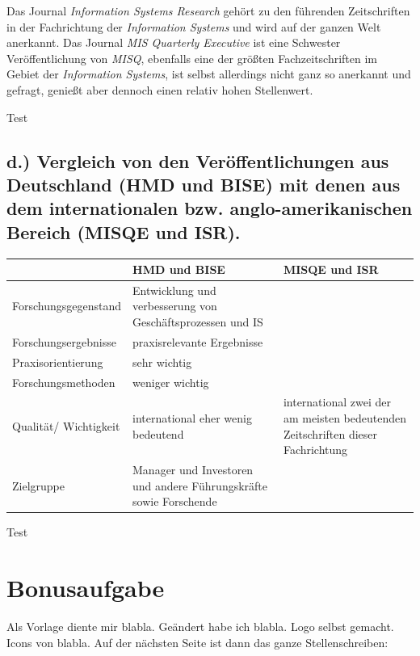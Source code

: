 \documentclass[12pt,utf8]{scrartcl}
\begin{document}
\begin{flushleft}
Das Journal \emph{Information Systems Research} gehört zu den führenden Zeitschriften in der Fachrichtung der \emph{Information Systems} und wird auf der ganzen Welt anerkannt. Das Journal \emph{MIS Quarterly Executive} ist eine Schwester Veröffentlichung von \emph{MISQ}, ebenfalls eine der größten Fachzeitschriften im Gebiet der \emph{Information Systems}, ist selbst allerdings nicht ganz so anerkannt und gefragt, genießt aber dennoch einen relativ hohen Stellenwert.

Test

\subsection{\label{sub4:einfuehrung}d.) Vergleich von den Veröffentlichungen aus Deutschland (HMD und BISE) mit denen aus dem internationalen bzw. anglo-amerikanischen Bereich (MISQE und ISR).}

\begin{tabular}{|p{4cm}|p{5.5cm}|p{5.5cm}|}
\hline
& HMD und BISE & MISQE und ISR \\
\hline
Forschungsgegenstand & Entwicklung und verbesserung von Geschäftsprozessen und IS &  \\
\hline
Forschungsergebnisse & praxisrelevante Ergebnisse &  \\
\hline
Praxisorientierung & sehr wichtig &  \\
\hline
Forschungsmethoden & weniger wichtig &  \\
\hline
Qualität/ Wichtigkeit & international eher wenig bedeutend & international zwei der am meisten bedeutenden Zeitschriften dieser Fachrichtung \\
\hline
Zielgruppe & Manager und Investoren und andere Führungskräfte sowie Forschende &  \\
\hline
\end{tabular}
\newline
\newline
\newline

Test

\section{\label{sec:bonus}Bonusaufgabe}

Als Vorlage diente mir \cite{online1}  blabla. Geändert habe ich blabla. Logo selbst gemacht.
Icons von blabla\cite{online2}. Auf der nächsten Seite ist dann das ganze Stellenschreiben:


\end{flushleft}
\end{document}
